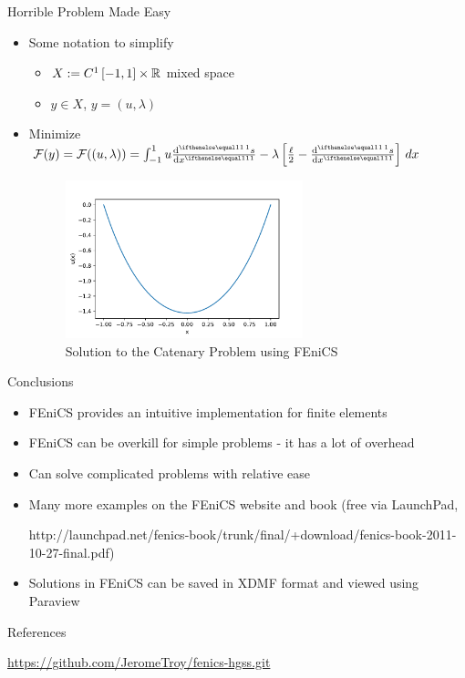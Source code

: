 \documentclass[serif]{beamer}
\begin{document}
\begin{frame}{Horrible Problem Made Easy}
    \begin{itemize}
        \item Some notation to simplify
        \begin{itemize}
            \item $X:= C^1\left[-1, 1\right] \times \mathbb{R}$ mixed space
            \item $y \in X$, $y = (u, \lambda)$
        \end{itemize}
        \item Minimize $\mathcal F(y) = \mathcal F((u, \lambda)) = \int_{-1}^1 u \der{s}{x} - \lambda \left[\frac{\ell}{2} - 
            \der{s}{x}\right] \, dx$
        \begin{figure}
            \centering
            \includegraphics[width=0.65\textwidth,height=0.65\textheight,keepaspectratio]
            {figures/fenics-catenary.pdf}
            \caption{Solution to the Catenary Problem using FEniCS}
            \label{fig:fenics-catenary}
        \end{figure}
    \end{itemize}
\end{frame}

\begin{frame}{Conclusions}
	\begin{itemize}
		\item FEniCS provides an intuitive implementation for finite elements
		\item FEniCS can be overkill for simple problems - it has a lot of overhead
		\item Can solve complicated problems with relative ease
		\item Many more examples on the FEniCS website and book (free via LaunchPad,

			http://launchpad.net/fenics-book/trunk/final/+download/fenics-book-2011-10-27-final.pdf)
		\item Solutions in FEniCS can be saved in XDMF format and viewed using 
			Paraview
	\end{itemize}
\end{frame}

\begin{frame}{References}
    \nocite{*}
    
    
    
    \url{https://github.com/JeromeTroy/fenics-hgss.git}
\end{frame}
\end{document}
